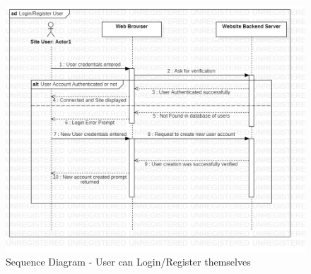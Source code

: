 \begin{figure}[H]
  \centering
  \includegraphics[width=\linewidth]{img/sequence-diagram-s4-login-register.jpg}
  \caption{Sequence Diagram - User can Login/Register themselves}
\end{figure}

\vspace*{\fill}
\newpage

